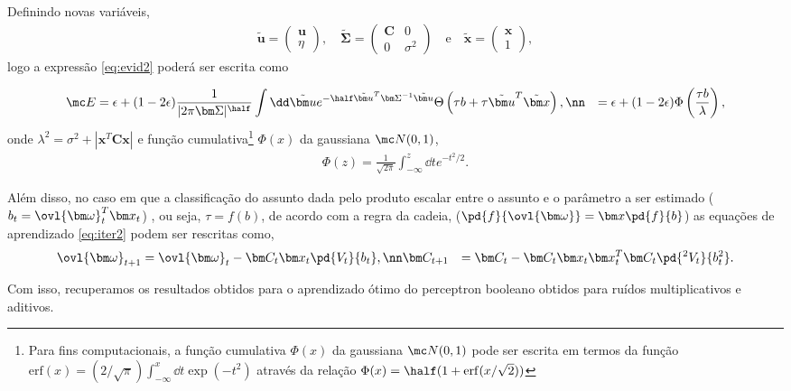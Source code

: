Definindo novas variáveis,
\begin{align}
\tilde{\bm u}=
\left(
\begin{array}{c}
\bm u \\
\eta
\end{array}
\right),
\quad
%
\tilde{\bm \Sigma}=
\left(
\begin{array}{cc}
\bm C & 0 \\
0     & \sigma^2
\end{array}
\right)    
\quad\mathrm{e}\quad
%
\tilde{\bm x}=
\left(
\begin{array}{c}
\bm x \\
1
\end{array}
\right),
\end{align}
logo a expressão \eqref{eq:evid2} poderá ser escrita como 

\begin{align}
\mc E & = 
\epsilon + (1-2\epsilon) \frac{1}{|2\pi\bm \Sigma|^\half}
\int\dd \tilde{\bm u}
e^{-\half \tilde{\bm u}^T \bm \Sigma^{-1} \tilde{\bm u}}
\Theta\left(\tau b + \tau \tilde{\bm u}^T \tilde{\bm x} \right),\nn
 & = 
\epsilon + (1-2\epsilon)
\Phi\left( \frac{\tau b}{\lambda}\right),
\label{eq:ptau3}
\end{align}
onde $\lambda^2 = \sigma^2 + |\bm x^T \bm C \bm x|$ e função
cumulativa\footnote{Para fins computacionais, a função cumulativa
$\Phi(x)$ da gaussiana $\mc N(0,1)$ pode ser escrita em termos da função
$\mathrm{erf}(x) = (2/\sqrt{\pi})\int_{-\infty}^x \dd t \exp(-t^2)$ através
da relação $\Phi(x) = \half(1+\mathrm{erf}(x/\sqrt 2))$} $\Phi(x)$ da
gaussiana $\mc N(0,1)$,
\begin{align}
    \Phi(z) = \frac{1}{\sqrt{2\pi}}\int_{-\infty}^{z}\dd t e^{-t^2/2}.
\end{align}

Além  disso, no caso em que a classificação do assunto dada pelo produto
escalar entre o assunto e o parâmetro a ser estimado ($b_t = \ovl{\bm
\omega}_t^T\bm x_t$) , ou seja, $\tau=f(b)$, de acordo com a regra da cadeia,
($\pd{f}{\ovl{\bm \omega}} = \bm x \pd{f}{b}$) as equações de aprendizado
\eqref{eq:iter2} podem ser rescritas como,
\begin{align}
     \ovl{\bm \omega}_{t+1} &= \ovl{\bm \omega}_t - \bm C_t \bm
        x_t\pd{V_t}{b_t}, \nn
     \bm C_{t+1} &= 
     \bm C_t - \bm C_t\bm x_t\bm x_t^T\bm C_t
        \pd{^2V_t}{b_t^2}.
     \label{eq:iter3}
\end{align}

Com isso, recuperamos os resultados obtidos para o aprendizado ótimo do
perceptron booleano obtidos para ruídos multiplicativos\cite{Kinouchi1992}
e aditivos\cite{Biehl1995}.


